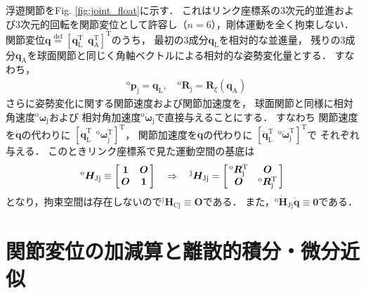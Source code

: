 ﻿\documentclass[a4paper]{jsarticle}
\begin{document}
浮遊関節をFig. \ref{fig:joint_float}に示す．
これはリンク座標系の3次元的並進および3次元的回転を関節変位として許容し（$n=6$），剛体運動を全く拘束しない．
関節変位$\bm{q}\overset{\mathrm{def}}{=}[\bm{q}_{\mathrm{L}}^{\mathrm{T}}~~\bm{q}_{\mathrm{A}}^{\mathrm{T}}]^{\mathrm{T}}$のうち，
最初の3成分$\bm{q}_{\mathrm{L}}$を相対的な並進量，
残りの3成分$\bm{q}_{\mathrm{A}}$を球面関節と同じく角軸ベクトルによる相対的な姿勢変化量とする．
すなわち，
\begin{align*}
&{}^{\mathrm{o}}\bm{p}_{\mathrm{j}}=\bm{q}_{\mathrm{L}},\quad
{}^{\mathrm{o}}\bm{R}_{\mathrm{j}}=\bm{R}_{\xi}(\bm{q}_{\mathrm{A}})
\end{align*}
さらに姿勢変化に関する関節速度および関節加速度を，
球面関節と同様に相対角速度${}^{\mathrm{o}}\bm{\omega}_{\mathrm{j}}$および
相対角加速度${}^{\mathrm{o}}\dot{\bm{\omega}}_{\mathrm{j}}$で直接与えることにする．
すなわち
関節速度を$\dot{\bm{q}}$の代わりに
$[\dot{\bm{q}}_{\mathrm{L}}^{\mathrm{T}}~~{}^{\mathrm{o}}\bm{\omega}_{\mathrm{j}}^{\mathrm{T}}]^{\mathrm{T}}$，
関節加速度を$\ddot{\bm{q}}$の代わりに
$[\ddot{\bm{q}}_{\mathrm{L}}^{\mathrm{T}}~~{}^{\mathrm{o}}\dot{\bm{\omega}}_{\mathrm{j}}^{\mathrm{T}}]^{\mathrm{T}}$で
それぞれ与える．
このときリンク座標系で見た運動空間の基底は
\begin{align*}
{}^{\mathrm{o}}\bm{H}_{\mathrm{Jj}}\equiv\left[\begin{array}{@{\,}cc@{\,}}
 \bm{1} & \bm{O} \\
 \bm{O} & \bm{1} \\
\end{array}\right]\quad\Rightarrow\quad
{}^{\mathrm{j}}\bm{H}_{\mathrm{Jj}}=\left[\begin{array}{@{\,}cc@{\,}}
 {}^{\mathrm{o}}\bm{R}_{\mathrm{j}}^{\mathrm{T}} & \bm{O} \\
 \bm{O} & {}^{\mathrm{o}}\bm{R}_{\mathrm{j}}^{\mathrm{T}} \\
\end{array}\right]
\end{align*}
となり，拘束空間は存在しないので${}^{\mathrm{j}}\bm{H}_{\mathrm{Cj}}\equiv\bm{O}$である．
また，${}^{\mathrm{o}}\dot{\bm{H}}_{\mathrm{Jj}}\dot{\bm{q}}\equiv\bm{0}$である．




\section{関節変位の加減算と離散的積分・微分近似}
\end{document}
